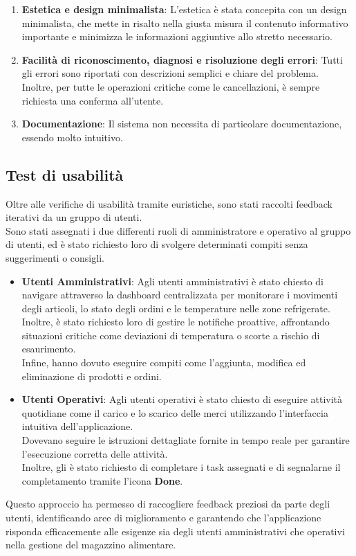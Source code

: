 \begin{enumerate}
    \item \textbf{Estetica e design minimalista}: L’estetica è stata concepita con un design minimalista, che mette in risalto nella giusta misura il contenuto informativo importante e minimizza le informazioni aggiuntive allo stretto necessario.

    \item \textbf{Facilità di riconoscimento, diagnosi e risoluzione degli errori}: Tutti gli errori sono riportati con descrizioni semplici e chiare del problema.\\ Inoltre, per tutte le operazioni critiche come le cancellazioni, è sempre richiesta una conferma all’utente.

    \item \textbf{Documentazione}: Il sistema non necessita di particolare documentazione, essendo molto intuitivo.
\end{enumerate}

\subsection{Test di usabilità}
Oltre alle verifiche di usabilità tramite euristiche, sono stati raccolti feedback iterativi da un gruppo di utenti.\\
Sono stati assegnati i due differenti ruoli di amministratore e operativo al gruppo di utenti, ed è stato richiesto
loro di svolgere determinati compiti senza suggerimenti o consigli.

\begin{itemize}
    \item \textbf{Utenti Amministrativi}: Agli utenti amministrativi è stato chiesto di navigare attraverso la dashboard centralizzata per monitorare i movimenti degli articoli, lo stato degli ordini e le temperature nelle zone refrigerate.\\ Inoltre, è stato richiesto loro di gestire le notifiche proattive, affrontando situazioni critiche come deviazioni di temperatura o scorte a rischio di esaurimento.\\ Infine, hanno dovuto eseguire compiti come l'aggiunta, modifica ed eliminazione di prodotti e ordini.

    \item \textbf{Utenti Operativi}: Agli utenti operativi è stato chiesto di eseguire attività quotidiane come il carico e lo scarico delle merci utilizzando l'interfaccia intuitiva dell'applicazione.\\ Dovevano seguire le istruzioni dettagliate fornite in tempo reale per garantire l'esecuzione corretta delle attività.\\ Inoltre, gli è stato richiesto di completare i task assegnati e di segnalarne il completamento tramite l'icona \textbf{Done}.
\end{itemize}

Questo approccio ha permesso di raccogliere feedback preziosi da parte degli utenti, identificando aree di
miglioramento e garantendo che l'applicazione risponda efficacemente alle esigenze sia degli utenti amministrativi
che operativi nella gestione del magazzino alimentare.

